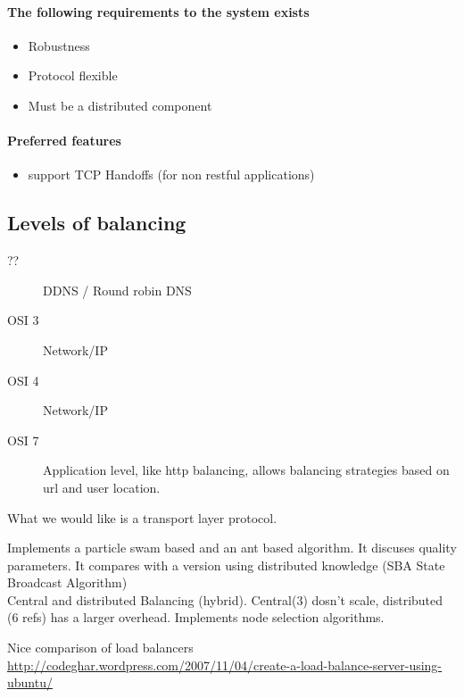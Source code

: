 \paragraph{The following requirements to the system exists}
\begin{itemize}
	\item Robustness
	\item Protocol flexible
	\item Must be a distributed component
\end{itemize}

\paragraph{Preferred features}
\begin{itemize}
	\item support TCP Handoffs (for non restful applications)
\end{itemize}

\subsection{Levels of balancing}
\begin{description}
	\item[??] DDNS / Round robin DNS
	\item[OSI 3] Network/IP %
	\item[OSI 4] Network/IP
	\item[OSI 7] {Application level, like http balancing, allows balancing strategies based on url and user location.}
\end{description}

What we would like is a transport layer protocol.
\vspace{1cm}

\noindent\cite{Ludwig:SwarmIntelligenceGridLoadBalancing} 
Implements a particle swam based and an ant based algorithm. 
It discuses quality parameters.
It compares with a version using distributed knowledge (SBA State Broadcast Algorithm)
\\

\noindent\cite{MayuriMehta:HybridDynamicLB} Central and distributed Balancing (hybrid). Central(3) dosn't scale, distributed (6 refs) has a larger overhead. Implements node selection algorithms.

Nice comparison of load balancers
\url{http://codeghar.wordpress.com/2007/11/04/create-a-load-balance-server-using-ubuntu/}

